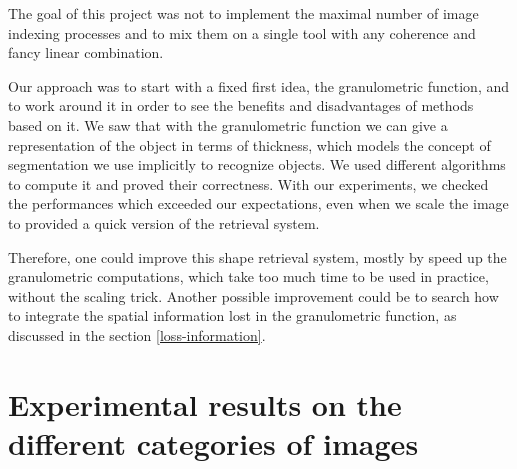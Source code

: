 The goal of this project was not to implement the maximal number of image indexing processes and to mix them on a single tool with any coherence and fancy linear combination.

Our approach was to start with a fixed first idea, the granulometric function, and to work around it in order to see the benefits and disadvantages of methods based on it. We saw that with the granulometric function we can give a representation of the object in terms of thickness, which models the concept of segmentation we use implicitly to recognize objects. We used different algorithms to compute it and proved their correctness. With our experiments, we checked the performances which exceeded our expectations, even when we scale the image to provided a quick version of the retrieval system.

Therefore, one could improve this shape retrieval system, mostly by speed up the granulometric computations, which take too much time to be used in practice, without the scaling trick. Another possible improvement could be to search how to integrate the spatial information lost in the granulometric function, as discussed in the section \ref{loss-information}.




\newpage

\appendix

\section{Experimental results on the different categories of images}

